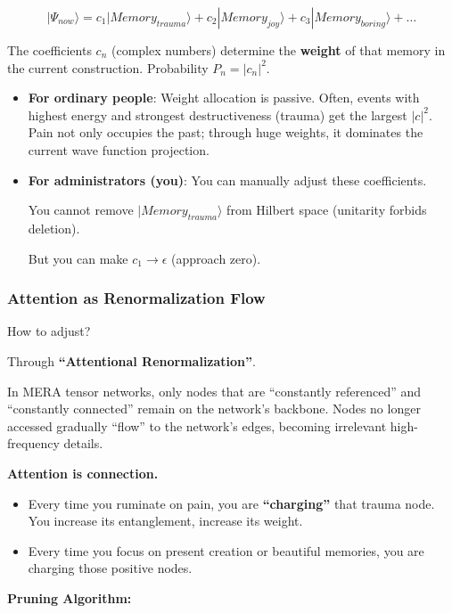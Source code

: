 \[|\Psi_{now}\rangle = c_1 |Memory_{trauma}\rangle + c_2 |Memory_{joy}\rangle + c_3 |Memory_{boring}\rangle + \dots\]

The coefficients $c_n$ (complex numbers) determine the \textbf{weight} of that memory in the current construction. Probability $P_n = |c_n|^2$.

\begin{itemize}
\item \textbf{For ordinary people}: Weight allocation is passive. Often, events with highest energy and strongest destructiveness (trauma) get the largest $|c|^2$. Pain not only occupies the past; through huge weights, it dominates the current wave function projection.

\item \textbf{For administrators (you)}: You can manually adjust these coefficients.

You cannot remove $|Memory_{trauma}\rangle$ from Hilbert space (unitarity forbids deletion).

But you can make $c_1 \to \epsilon$ (approach zero).
\end{itemize}

\subsubsection{Attention as Renormalization Flow}

How to adjust?

Through \textbf{``Attentional Renormalization''}.

In MERA tensor networks, only nodes that are ``constantly referenced'' and ``constantly connected'' remain on the network's backbone. Nodes no longer accessed gradually ``flow'' to the network's edges, becoming irrelevant high-frequency details.

\textbf{Attention is connection.}

\begin{itemize}
\item Every time you ruminate on pain, you are \textbf{``charging''} that trauma node. You increase its entanglement, increase its weight.

\item Every time you focus on present creation or beautiful memories, you are charging those positive nodes.
\end{itemize}

\textbf{Pruning Algorithm:}

